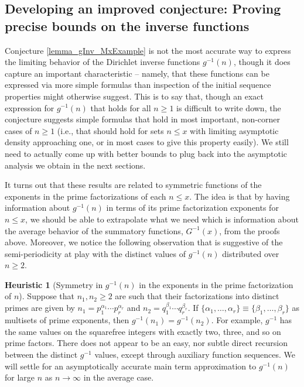 \documentclass[11pt,reqno,a4letter]{article}
\numberwithin{figure}{section}
\numberwithin{table}{section}
\theoremstyle{plain}
\numberwithin{theorem}{section}
\theoremstyle{definition}
\newtheorem{heuristic}[theorem]{Heuristic}
\begin{document}
\subsection{Developing an improved conjecture: 
            Proving precise bounds on the inverse functions} 

Conjecture \ref{lemma_gInv_MxExample} is not the most accurate way to express the limiting behavior of the 
Dirichlet inverse functions $g^{-1}(n)$, though it does capture an important characteristic -- namely, that these 
functions can be expressed via more simple formulas than inspection of the initial sequence properties might 
otherwise suggest. This is to say that, though an exact expression for $g^{-1}(n)$ that holds for all $n \geq 1$ 
is difficult to write down, the conjecture suggests simple formulas that hold in most important, non-corner cases 
of $n \geq 1$ (i.e., that should hold for sets $n \leq x$ with limiting asymptotic density approaching one, or 
in most cases to give this property easily). 
We still need to actually come up with better bounds to plug back into the asymptotic analysis we obtain in the 
next sections. 

It turns out that these results are related to symmetric functions of the exponents in the 
prime factorizations of each $n \leq x$. The idea is that by having information about $g^{-1}(n)$ 
in terms of its prime factorization exponents for $n \leq x$, we should be able to extrapolate 
what we need which is information about the average behavior of the summatory functions, $G^{-1}(x)$, 
from the proofs above. 
Moreover, we notice the following observation that is suggestive of the semi-periodicity at play 
with the distinct values of $g^{-1}(n)$ distributed over $n \geq 2$.

\begin{heuristic}[Symmetry in $g^{-1}(n)$ in the exponents in the prime factorization of $n$] 
Suppose that $n_1, n_2 \geq 2$ are such that their factorizations into distinct primes are 
given by $n_1 = p_1^{\alpha_1} \cdots p_r^{\alpha_r}$ and $n_2 = q_1^{\beta_1} \cdots q_r^{\beta_r}$. 
If $\{\alpha_1, \ldots, \alpha_r\} \equiv \{\beta_1, \ldots, \beta_r\}$ as multisets of prime exponents, 
then $g^{-1}(n_1) = g^{-1}(n_2)$. For example, $g^{-1}$ has the same values on the squarefree integers 
with exactly two, three, and so on prime factors. There does not appear to be an easy, nor subtle 
direct recursion between the distinct $g^{-1}$ values, except through auxiliary function sequences. 
We will settle for an asymptotically accurate main term approximation to $g^{-1}(n)$ for large $n$ as 
$n \rightarrow \infty$ in the average case. 
\end{heuristic} 
\end{document}
